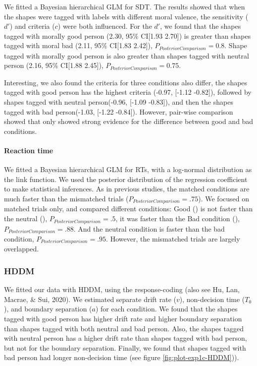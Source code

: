 \documentclass[
  english,
  man]{apa6}
\let\oldparagraph\paragraph
\renewcommand{\paragraph}[1]{\oldparagraph{#1}\mbox{}}
\begin{document}
We fitted a Bayesian hierarchical GLM for SDT. The results showed that when the shapes were tagged with labels with different moral valence, the sensitivity (\(d'\)) and criteria (\(c\)) were both influenced. For the \(d'\), we found that the shapes tagged with morally good person (2.30, 95\% CI{[}1.93 2.70{]}) is greater than shapes tagged with moral bad (2.11, 95\% CI{[}1.83 2.42{]}), \(P_{PosteriorComparison} = 0.8\). Shape tagged with morally good person is also greater than shapes tagged with neutral person (2.16, 95\% CI{[}1.88 2.45{]}), \(P_{PosteriorComparison} = 0.75\).

Interesting, we also found the criteria for three conditions also differ, the shapes tagged with good person has the highest criteria (-0.97, {[}-1.12 -0.82{]}), followed by shapes tagged with neutral person(-0.96, {[}-1.09 -0.83{]}), and then the shapes tagged with bad person(-1.03, {[}-1.22 -0.84{]}). However, pair-wise comparison showed that only showed strong evidence for the difference between good and bad conditions.

\hypertarget{reaction-time-1}{%
\paragraph{Reaction time}\label{reaction-time-1}}

We fitted a Bayesian hierarchical GLM for RTs, with a log-normal distribution as the link function. We used the posterior distribution of the regression coefficient to make statistical inferences. As in previous studies, the matched conditions are much faster than the mismatched trials (\(P_{PosteriorComparison} = .75\)). We focused on matched trials only, and compared different conditions: Good () is not faster than the neutral (), \(P_{PosteriorComparison} = .5\), it was faster than the Bad condition (), \(P_{PosteriorComparison} = .88\). And the neutral condition is faster than the bad condition, \(P_{PosteriorComparison} = .95\). However, the mismatched trials are largely overlapped.

\hypertarget{hddm-2}{%
\subsubsection{HDDM}\label{hddm-2}}

We fitted our data with HDDM, using the response-coding (also see Hu, Lan, Macrae, \& Sui, 2020). We estimated separate drift rate (\(v\)), non-decision time (\(T_{0}\)), and boundary separation (\(a\)) for each condition. We found that the shapes tagged with good person has higher drift rate and higher boundary separation than shapes tagged with both neutral and bad person. Also, the shapes tagged with neutral person has a higher drift rate than shapes tagged with bad person, but not for the boundary separation. Finally, we found that shapes tagged with bad person had longer non-decision time (see figure \ref{fig:plot-exp1c-HDDM})).
\end{document}

